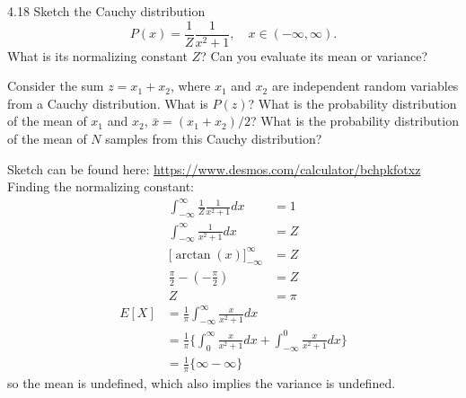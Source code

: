 \documentclass[12pt, a4paper]{article}
\begin{document}
\begin{prob}{4.18}
    Sketch the Cauchy distribution
\begin{equation}\tag{4.40}
P(x) = \frac{1}{Z} \frac{1}{x^2 + 1}, \quad x \in (-\infty, \infty).
\end{equation}
What is its normalizing constant $Z$? Can you evaluate its mean or variance?

\vspace{0.5em}
\noindent Consider the sum $z = x_1 + x_2$, where $x_1$ and $x_2$ are independent random variables from a Cauchy distribution. What is $P(z)$? What is the probability distribution of the mean of $x_1$ and $x_2$, $\bar{x} = (x_1 + x_2)/2$? What is the probability distribution of the mean of $N$ samples from this Cauchy distribution?
\end{prob}
\begin{sol}
    Sketch can be found here: \href{https://www.desmos.com/calculator/bchpkfotxz}{https://www.desmos.com/calculator/bchpkfotxz} \\

    Finding the normalizing constant:
\begin{align*}
    \int_{-\infty}^{\infty} \frac{1}{Z} \frac{1}{x^2 + 1} dx &= 1 \\
    \int_{-\infty}^{\infty} \frac{1}{x^2 + 1} dx &= Z \\
    \big[ \arctan(x) \big]_{-\infty}^{\infty} &= Z \\
    \frac{\pi}{2} - (- \frac{\pi}{2}) &= Z \\
    Z &= \pi 
\end{align*}
\begin{align*}
    E[X] &= \frac{1}{\pi} \int_{-\infty}^{\infty} \frac{x}{x^2 + 1} dx \\
    &= \frac{1}{\pi} \{ \int_{0}^{\infty} \frac{x}{x^2 + 1} dx + \int_{-\infty}^{0} \frac{x}{x^2 + 1} dx \} \\
    &= \frac{1}{\pi} \{ \infty - \infty \}
\end{align*}
so the mean is undefined, which also implies the variance is undefined. \\


\end{sol}
\end{document}
